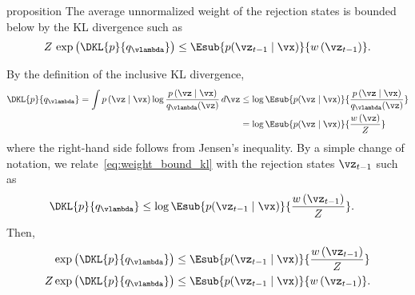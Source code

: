 
  \begin{theoremEnd}[]{proposition}\label{thm:rej_kl_bound}
    The average unnormalized weight of the rejection states is bounded below by the KL divergence such as
    \[
    Z\,\exp\big(\DKL{p}{q_{\vlambda}}\big) \leq \Esub{p(\vz_{t-1}\mid\vx)}{w\,(\vz_{t-1})}.
    \]
  \end{theoremEnd}
\begin{proofEnd}
    By the definition of the inclusive KL divergence,
    \begin{align}
      \DKL{p}{q_{\vlambda}} = \int p\,(\vz\mid\vx) \log \frac{p\,(\vz\mid\vx)}{q_{\vlambda}(\vz)} \, d\vz
      &\leq \log \Esub{p(\vz\mid\vx)}{\frac{p\,(\vz\mid\vx)}{q_{\vlambda}(\vz)}} \\
      &= \log \Esub{p(\vz\mid\vx)}{ \frac{w\,(\vz)}{Z} } \label{eq:weight_bound_kl}
    \end{align}
    where the right-hand side follows from Jensen's inequality.
    By a simple change of notation, we relate~\eqref{eq:weight_bound_kl} with the rejection states \(\vz_{t-1}\) such as
    \begin{align}
      \DKL{p}{q_{\vlambda}} &\leq \log \Esub{p(\vz_{t-1}\mid\vx)}{\frac{w\,(\vz_{t-1})}{Z}}.
    \end{align}
    Then,
    \begin{align}
      \exp\big(\DKL{p}{q_{\vlambda}}\big) &\leq \Esub{p(\vz_{t-1}\mid\vx)}{
        \frac{w\,(\vz_{t-1})}{Z}} \\
      Z \exp\big(\DKL{p}{q_{\vlambda}}\big) &\leq \Esub{p(\vz_{t-1}\mid\vx)}{w\,(\vz_{t-1})}.
    \end{align}
\end{proofEnd}

